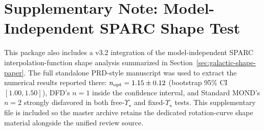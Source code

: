 \section*{Supplementary Note: Model-Independent SPARC Shape Test}
This package also includes a v3.2 integration of the model-independent SPARC interpolation-function shape analysis summarized in Section~\ref{sec:galactic-shape-paper}. The full standalone PRD-style manuscript was used to extract the numerical results reported there: $n_{\rm opt}=1.15\pm0.12$ (bootstrap 95\% CI $[1.00,1.50]$), DFD's $n=1$ inside the confidence interval, and Standard MOND's $n=2$ strongly disfavored in both free-$\Upsilon_\star$ and fixed-$\Upsilon_\star$ tests. This supplementary file is included so the master archive retains the dedicated rotation-curve shape material alongside the unified review source.
